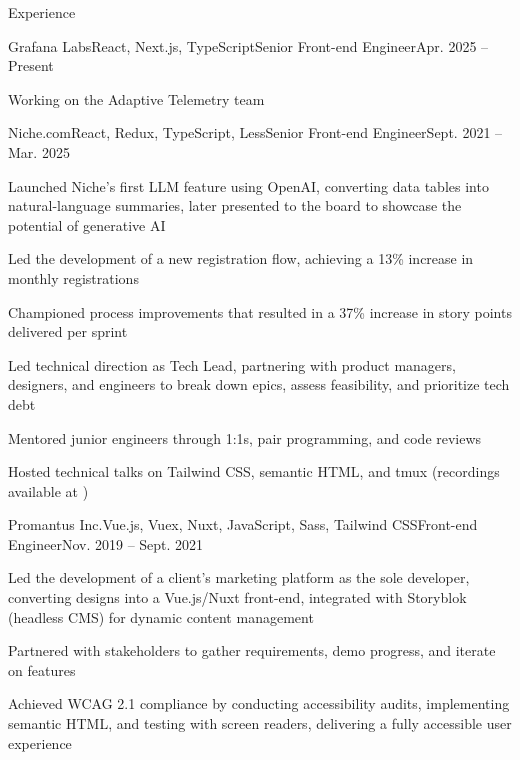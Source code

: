 \documentclass{resume} %
\begin{document}
\begin{rSection}{Experience}

  \begin{rSubsection}{Grafana Labs}{React, Next.js, TypeScript}{Senior Front-end Engineer}{Apr. 2025 – Present}
    \item Working on the Adaptive Telemetry team
  \end{rSubsection}
  
  \begin{rSubsection}{Niche.com}{React, Redux, TypeScript, Less}{Senior Front-end Engineer}{Sept. 2021 – Mar. 2025}
    \item Launched Niche’s first LLM feature using OpenAI, converting data tables into natural-language summaries, later presented to the board to showcase the potential of generative AI
    \item Led the development of a new registration flow, achieving a 13\% increase in monthly registrations

    
    \item Championed process improvements that resulted in a 37\% increase in story points delivered per sprint
    \item Led technical direction as Tech Lead, partnering with product managers, designers, and engineers to break down epics, assess feasibility, and prioritize tech debt
    \item Mentored junior engineers through 1:1s, pair programming, and code reviews
    \item Hosted technical talks on Tailwind CSS, semantic HTML, and tmux (recordings available at \href{http://jgs.lol/}{})
  \end{rSubsection}

  \begin{rSubsection}{Promantus Inc.}{Vue.js, Vuex, Nuxt, JavaScript, Sass, Tailwind CSS}{Front-end Engineer}{Nov. 2019 – Sept. 2021}
    \item Led the development of a client’s marketing platform as the sole developer, converting designs into a Vue.js/Nuxt front-end, integrated with Storyblok (headless CMS) for dynamic content management
    \item Partnered with stakeholders to gather requirements, demo progress, and iterate on features
    \item Achieved WCAG 2.1 compliance by conducting accessibility audits, implementing semantic HTML, and testing with screen readers, delivering a fully accessible user experience
  \end{rSubsection}

\end{rSection}
\end{document}
